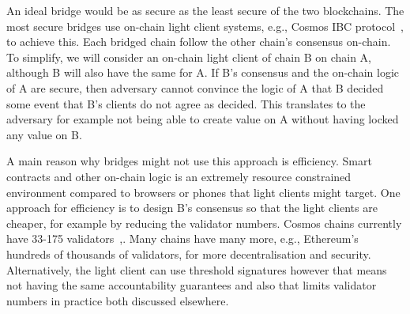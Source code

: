 \noindent An ideal bridge would be as secure as the least secure of the two blockchains. The most secure bridges use on-chain light client systems, e.g., Cosmos IBC protocol~\cite{IBC_paper}, to achieve this. Each bridged chain follow the other chain's consensus on-chain. To simplify, we will consider an on-chain light client of chain B on chain A, although B will also have the same for A. If B's consensus and the on-chain logic of A are secure, then adversary cannot convince the logic of A that B decided some event that B's clients do not agree as decided. This translates to the adversary for example not being able to create value on A without having locked any value on B.

\noindent A main reason why bridges might not use this approach is efficiency. Smart contracts and other on-chain logic is an extremely resource constrained environment compared to browsers or phones that light clients might target. One approach for efficiency is to design B's consensus so that the light clients are cheaper, for example by reducing the validator numbers. Cosmos chains currently have 33-175 validators~\cite{CosmosValNYX},\cite{CosmosValHUB}. Many chains have many more, e.g., Ethereum's hundreds of thousands of validators, for more decentralisation and security. Alternatively, the light client can use threshold signatures however that means not having the same accountability guarantees and also that limits validator numbers in practice {\color{red} both discussed elsewhere}.


